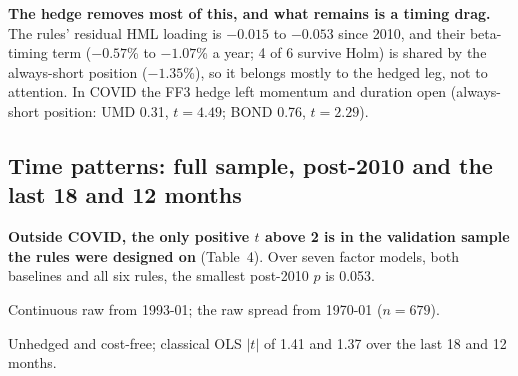 \textbf{The hedge removes most of this, and what remains is a timing drag.} The rules' residual HML loading is $-0.015$ to $-0.053$ since 2010, and their \citet{ln2006} beta-timing term ($-0.57$\% to $-1.07$\% a year; 4 of 6 survive Holm) is shared by the always-short position ($-1.35$\%), so it belongs mostly to the hedged leg, not to attention. In COVID the FF3 hedge left momentum and duration open (always-short position: UMD 0.31, $t=4.49$; BOND 0.76, $t=2.29$).

\subsection{Time patterns: full sample, post-2010 and the last 18 and 12 months}
\label{sec:time}

\textbf{Outside COVID, the only positive $t$ above 2 is in the validation sample the rules were designed on} (Table~4). Over seven factor models, both baselines and all six rules, the smallest post-2010 $p$ is 0.053.

\begin{table}[!htb]
\caption{Time patterns. Net return and FF3 alpha (\% a year, NW(6) $t$) of three corrected-baseline rules, the always-short position and the raw GB spread. Under $t(n-4)$, 18 and 12 months need $|t|$ above 2.14 and 2.31. Wherever the rules gain, the always-short position earns at least two-thirds of the best rule's return.}
\label{tab:time}
\centering\scriptsize
\setlength{\tabcolsep}{4.5pt}
\begin{threeparttable}

\begin{tablenotes}\scriptsize
\item[a] Continuous raw from 1993-01; the raw spread from 1970-01 ($n=679$). \item[b] Unhedged and cost-free; classical OLS $|t|$ of 1.41 and 1.37 over the last 18 and 12 months.
\end{tablenotes}
\end{threeparttable}
\end{table}


